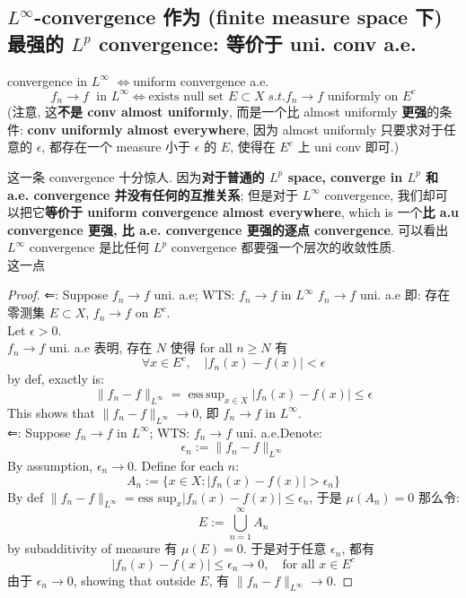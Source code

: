 \documentclass[lang=cn,11pt]{elegantbook}
\begin{document}
\subsection{$L^\infty$-convergence 作为 (finite measure space 下) 最强的 $L^p$ convergence: 等价于 uni. conv a.e.}
\begin{theorem}{convergence in $L^\infty$ $\iff$uniform convergence a.e.}
\[  f_n \to f \; \text{ in } L^\infty \iff \text{exists null set } E\subset X\; s.t. f_n\to f \text{ uniformly on } E^c \]
(注意, 这\textbf{不是 conv almost uniformly}, 而是一个比 almost uniformly\textbf{ 更强}的条件:\textbf{ conv uniformly almost everywhere}, 因为 almost uniformly 只要求对于任意的 $\epsilon$, 都存在一个 measure 小于 $\epsilon$ 的 $E$, 使得在 $E^c$ 上 uni conv 即可.)
\end{theorem}
\begin{remark}
    这一条 convergence 十分惊人. 因为\textbf{对于普通的 $L^p$ space, converge in $L^p$ 和 a.e. convergence 并没有任何的互推关系}; 但是对于 $L^\infty$ convergence, 我们却可以把它\textbf{等价于 uniform convergence almost everywhere}, which is 一个\textbf{比 a.u convergence 更强, 比 a.e. convergence 更强的逐点 convergence}. 可以看出 $L^\infty$ convergence 是比任何 $L^p$ convergence 都要强一个层次的收敛性质.\\
    这一点
\end{remark}
\begin{proof}
⇐: Suppose $f_n \to f$ uni. a.e; WTS: $f_n \to f$ in $L^\infty$
 $f_n \to f$ uni. a.e 即: 存在零测集 \(E\subset X\), \(f_n \to f\) on $E^c$.\\
Let $\epsilon > 0$.\\
$f_n \to f$ uni. a.e 表明, 存在 \(N\) 使得 for all \(n \ge N\) 有 \[
\forall x \in E^c,\quad |f_n(x) - f(x)| < \epsilon
\]
by def, exactly is: \[
\|f_n - f\|_{L^\infty} = \operatorname{ess\,sup}_{x \in X} |f_n(x) - f(x)| \le \epsilon
\]
This shows that \(\|f_n - f\|_{L^\infty} \to 0\), 即 \(f_n \to f\) in \(L^\infty\).\\

⇐: Suppose $f_n \to f$ in $L^\infty$; WTS: $f_n \to f$ uni. a.e.Denote: \[
\epsilon_n := \|f_n - f\|_{L^\infty}
\]
By assumption, $\epsilon_n \to 0$. Define for each $n$:
\[
A_n := \{x \in X : |f_n(x) - f(x)| > \epsilon_n\}
\]
By def \(\|f_n - f\|_{L^\infty} = \text{ess sup}_{x} |f_n(x) - f(x)| \le \epsilon_n\), 于是 \( \mu(A_n) = 0\)
那么令:  \[
E := \bigcup_{n=1}^\infty A_n
\]by subadditivity of measure 有 \(\mu(E) = 0\).
于是对于任意 $\epsilon_n$, 都有
\[
 |f_n(x) - f(x)| \le \epsilon_n \to 0,\quad \text{for all } x \in E^c
\]
由于 $\epsilon_n \to 0$, showing that outside $E$, 有  \(\|f_n - f\|_{L^\infty} \to 0\).
\end{proof}
\end{document}
